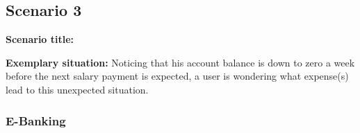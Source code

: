 
\subsection{Scenario 3}

\textbf{Scenario title:} \scenthree

\textbf{Exemplary situation:} Noticing that his account balance is down to zero a week before the next salary payment is expected, a user is wondering what expense(s) lead to this unexpected situation.



\subsubsection{E-Banking}

